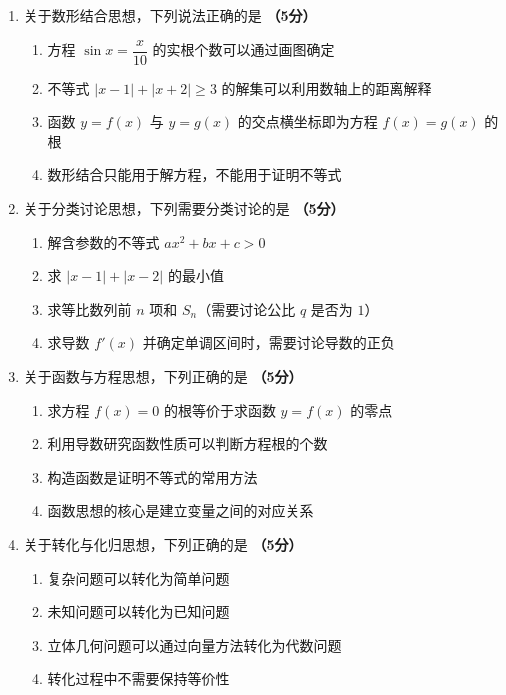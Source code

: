 \documentclass[12pt, a4paper]{ctexart}
\newcommand{\score}[1]{\hfill\textbf{（#1分）}}
\begin{document}
\begin{enumerate}[resume]

\item 关于数形结合思想，下列说法正确的是 \score{5}
\begin{enumerate}[label=\Alph*.]
    \item 方程 $\sin x=\dfrac{x}{10}$ 的实根个数可以通过画图确定
    \item 不等式 $|x-1|+|x+2|\geq 3$ 的解集可以利用数轴上的距离解释
    \item 函数 $y=f(x)$ 与 $y=g(x)$ 的交点横坐标即为方程 $f(x)=g(x)$ 的根
    \item 数形结合只能用于解方程，不能用于证明不等式
\end{enumerate}

\item 关于分类讨论思想，下列需要分类讨论的是 \score{5}
\begin{enumerate}[label=\Alph*.]
    \item 解含参数的不等式 $ax^2+bx+c>0$
    \item 求 $|x-1|+|x-2|$ 的最小值
    \item 求等比数列前 $n$ 项和 $S_n$（需要讨论公比 $q$ 是否为 $1$）
    \item 求导数 $f'(x)$ 并确定单调区间时，需要讨论导数的正负
\end{enumerate}

\item 关于函数与方程思想，下列正确的是 \score{5}
\begin{enumerate}[label=\Alph*.]
    \item 求方程 $f(x)=0$ 的根等价于求函数 $y=f(x)$ 的零点
    \item 利用导数研究函数性质可以判断方程根的个数
    \item 构造函数是证明不等式的常用方法
    \item 函数思想的核心是建立变量之间的对应关系
\end{enumerate}

\item 关于转化与化归思想，下列正确的是 \score{5}
\begin{enumerate}[label=\Alph*.]
    \item 复杂问题可以转化为简单问题
    \item 未知问题可以转化为已知问题
    \item 立体几何问题可以通过向量方法转化为代数问题
    \item 转化过程中不需要保持等价性
\end{enumerate}

\end{enumerate}
\end{document}
